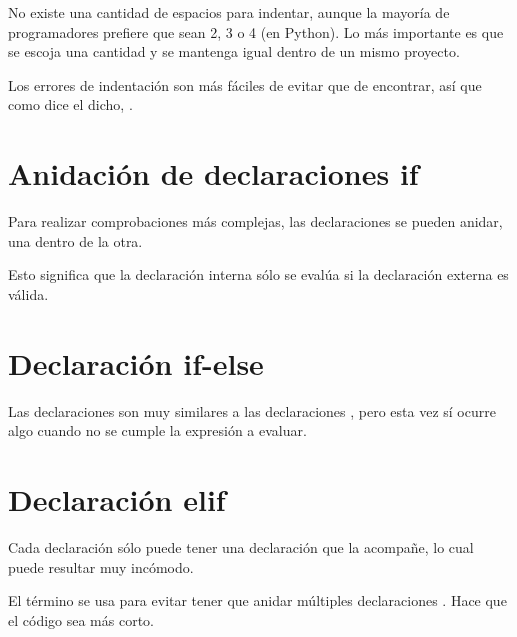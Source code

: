 No existe una cantidad  de espacios para indentar, aunque la mayoría de programadores prefiere que sean 2, 3 o 4 (en Python).
Lo más importante es que se escoja una cantidad y se mantenga igual dentro de un mismo proyecto.
\medskip

Los errores de indentación son más fáciles de evitar que de encontrar, así que como dice el dicho, .

\section{Anidación de declaraciones if}

Para realizar comprobaciones más complejas, las declaraciones  se pueden anidar, una dentro de la otra.
\medskip

Esto significa que la declaración  interna sólo se evalúa si la declaración  externa es válida.


\section{Declaración if-else}

Las declaraciones  son muy similares a las declaraciones , pero esta vez sí ocurre algo cuando no se cumple la expresión a evaluar.



\section{Declaración elif}

Cada declaración  sólo puede tener una declaración  que la acompañe, lo cual puede resultar muy incómodo.


El término  se usa para evitar tener que anidar múltiples declaraciones .
Hace que el código sea más corto.


